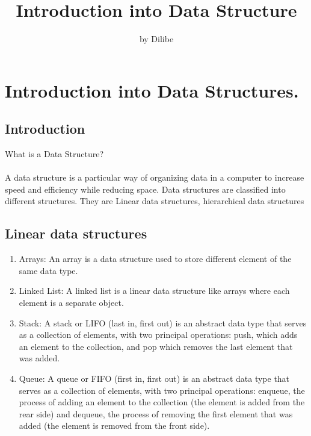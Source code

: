 \documentclass[11pt]{article} %
\title{Introduction into Data Structure}
\author{by Dilibe}
\begin{document}
	\maketitle
	
	\section{Introduction into Data Structures.}
	
	
	\subsection{Introduction}
	What is a Data Structure?
	\\ \paragraph{}
	A data structure is a particular way of organizing data in a computer to increase speed and efficiency while reducing space.
	Data structures are classified into different structures. They are Linear data structures, hierarchical data structures
	\subsection{Linear data structures}
	\begin{enumerate}
	 \item Arrays: An array is a data structure used to store different element of the same data type. 
	\item Linked List: A linked list is a linear data structure like arrays where each element is a separate object. 
	\item Stack: A stack or LIFO (last in, first out) is an abstract data type that serves as a collection of elements, with two principal operations: push, which adds an element to the collection, and pop which removes the last element that was added.
	\item Queue: A queue or FIFO (first in, first out) is an abstract data type that serves as a collection of elements, with two principal operations: enqueue, the process of adding an element to the collection (the element is added from the rear side) and dequeue, the process of removing the first element that was added (the element is removed from the front side).
	\end{enumerate}
\end{document}
